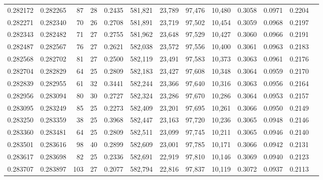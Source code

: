\begin{tabular}{rrrrrrrrrrrrr}
0.282172 & 0.282265 &  87 &  28 &                                     0.2435 & 581,821 &  23,789 &  97,476 &  10,480 & 0.3058 & 0.0971 & 0.2204 \\
0.282271 & 0.282340 &  70 &  26 &                                     0.2708 & 581,891 &  23,719 &  97,502 &  10,454 & 0.3059 & 0.0968 & 0.2197 \\
0.282343 & 0.282482 &  71 &  27 &                                     0.2755 & 581,962 &  23,648 &  97,529 &  10,427 & 0.3060 & 0.0966 & 0.2191 \\
0.282487 & 0.282567 &  76 &  27 &                                     0.2621 & 582,038 &  23,572 &  97,556 &  10,400 & 0.3061 & 0.0963 & 0.2183 \\
0.282568 & 0.282702 &  81 &  27 &                                     0.2500 & 582,119 &  23,491 &  97,583 &  10,373 & 0.3063 & 0.0961 & 0.2176 \\
0.282704 & 0.282829 &  64 &  25 &                                     0.2809 & 582,183 &  23,427 &  97,608 &  10,348 & 0.3064 & 0.0959 & 0.2170 \\
0.282839 & 0.282955 &  61 &  32 &                                     0.3441 & 582,244 &  23,366 &  97,640 &  10,316 & 0.3063 & 0.0956 & 0.2164 \\
0.282956 & 0.283094 &  80 &  30 &                                     0.2727 & 582,324 &  23,286 &  97,670 &  10,286 & 0.3064 & 0.0953 & 0.2157 \\
0.283095 & 0.283249 &  85 &  25 &                                     0.2273 & 582,409 &  23,201 &  97,695 &  10,261 & 0.3066 & 0.0950 & 0.2149 \\
0.283250 & 0.283359 &  38 &  25 &                                     0.3968 & 582,447 &  23,163 &  97,720 &  10,236 & 0.3065 & 0.0948 & 0.2146 \\
0.283360 & 0.283481 &  64 &  25 &                                     0.2809 & 582,511 &  23,099 &  97,745 &  10,211 & 0.3065 & 0.0946 & 0.2140 \\
0.283501 & 0.283616 &  98 &  40 &                                     0.2899 & 582,609 &  23,001 &  97,785 &  10,171 & 0.3066 & 0.0942 & 0.2131 \\
0.283617 & 0.283698 &  82 &  25 &                                     0.2336 & 582,691 &  22,919 &  97,810 &  10,146 & 0.3069 & 0.0940 & 0.2123 \\
0.283707 & 0.283897 & 103 &  27 &                                     0.2077 & 582,794 &  22,816 &  97,837 &  10,119 & 0.3072 & 0.0937 & 0.2113 \\

\end{tabular}
